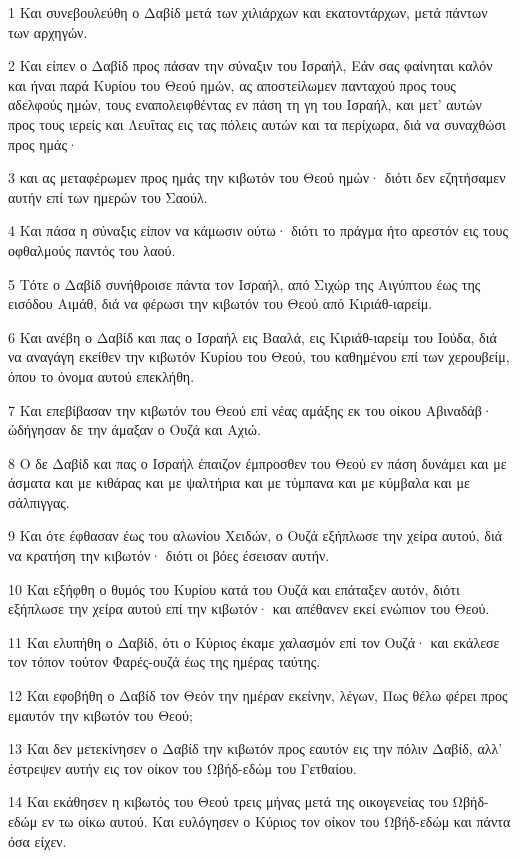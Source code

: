 \par 1 Και συνεβουλεύθη ο Δαβίδ μετά των χιλιάρχων και εκατοντάρχων, μετά πάντων των αρχηγών.
\par 2 Και είπεν ο Δαβίδ προς πάσαν την σύναξιν του Ισραήλ, Εάν σας φαίνηται καλόν και ήναι παρά Κυρίου του Θεού ημών, ας αποστείλωμεν πανταχού προς τους αδελφούς ημών, τους εναπολειφθέντας εν πάση τη γη του Ισραήλ, και μετ' αυτών προς τους ιερείς και Λευΐτας εις τας πόλεις αυτών και τα περίχωρα, διά να συναχθώσι προς ημάς·
\par 3 και ας μεταφέρωμεν προς ημάς την κιβωτόν του Θεού ημών· διότι δεν εζητήσαμεν αυτήν επί των ημερών του Σαούλ.
\par 4 Και πάσα η σύναξις είπον να κάμωσιν ούτω· διότι το πράγμα ήτο αρεστόν εις τους οφθαλμούς παντός του λαού.
\par 5 Τότε ο Δαβίδ συνήθροισε πάντα τον Ισραήλ, από Σιχώρ της Αιγύπτου έως της εισόδου Αιμάθ, διά να φέρωσι την κιβωτόν του Θεού από Κιριάθ-ιαρείμ.
\par 6 Και ανέβη ο Δαβίδ και πας ο Ισραήλ εις Βααλά, εις Κιριάθ-ιαρείμ του Ιούδα, διά να αναγάγη εκείθεν την κιβωτόν Κυρίου του Θεού, του καθημένου επί των χερουβείμ, όπου το όνομα αυτού επεκλήθη.
\par 7 Και επεβίβασαν την κιβωτόν του Θεού επί νέας αμάξης εκ του οίκου Αβιναδάβ· ώδήγησαν δε την άμαξαν ο Ουζά και Αχιώ.
\par 8 Ο δε Δαβίδ και πας ο Ισραήλ έπαιζον έμπροσθεν του Θεού εν πάση δυνάμει και με άσματα και με κιθάρας και με ψαλτήρια και με τύμπανα και με κύμβαλα και με σάλπιγγας.
\par 9 Και ότε έφθασαν έως του αλωνίου Χειδών, ο Ουζά εξήπλωσε την χείρα αυτού, διά να κρατήση την κιβωτόν· διότι οι βόες έσεισαν αυτήν.
\par 10 Και εξήφθη ο θυμός του Κυρίου κατά του Ουζά και επάταξεν αυτόν, διότι εξήπλωσε την χείρα αυτού επί την κιβωτόν· και απέθανεν εκεί ενώπιον του Θεού.
\par 11 Και ελυπήθη ο Δαβίδ, ότι ο Κύριος έκαμε χαλασμόν επί τον Ουζά· και εκάλεσε τον τόπον τούτον Φαρές-ουζά έως της ημέρας ταύτης.
\par 12 Και εφοβήθη ο Δαβίδ τον Θεόν την ημέραν εκείνην, λέγων, Πως θέλω φέρει προς εμαυτόν την κιβωτόν του Θεού;
\par 13 Και δεν μετεκίνησεν ο Δαβίδ την κιβωτόν προς εαυτόν εις την πόλιν Δαβίδ, αλλ' έστρεψεν αυτήν εις τον οίκον του Ωβήδ-εδώμ του Γετθαίου.
\par 14 Και εκάθησεν η κιβωτός του Θεού τρεις μήνας μετά της οικογενείας του Ωβήδ-εδώμ εν τω οίκω αυτού. Και ευλόγησεν ο Κύριος τον οίκον του Ωβήδ-εδώμ και πάντα όσα είχεν.


